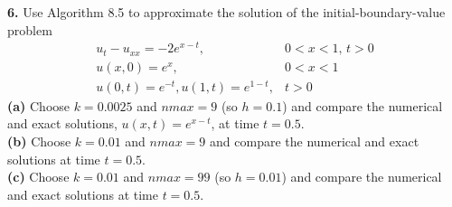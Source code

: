 \documentclass{amsbook}%
\theoremstyle{plain}
\numberwithin{equation}{section}
\begin{document}
		\noindent\textbf{6.} Use Algorithm 8.5 to approximate the solution of the initial-boundary-value problem 
		\begin{align}
			u_t-u_{xx}=-2e^{x-t}, & 0<x<1,\, t>0\\
			u(x,0)=e^x, & 0<x<1\\
			u(0,t)=e^{-t}, u(1,t)=e^{1-t}, & t>0
		\end{align}
		\textbf{(a)} Choose $k=0.0025$ and $nmax=9$ (so $h=0.1$) and compare the numerical and exact solutions, $u(x,t)=e^{x-t}$, at time $t=0.5$.\\
		\textbf{(b)} Choose $k=0.01$ and $nmax=9$ and compare the numerical and exact solutions at time $t=0.5$.\\
		\textbf{(c)} Choose $k=0.01$ and $nmax=99$ (so $h=0.01$) and compare the numerical and exact solutions at time $t=0.5$.
		\\[12pt]
		
\end{document}
